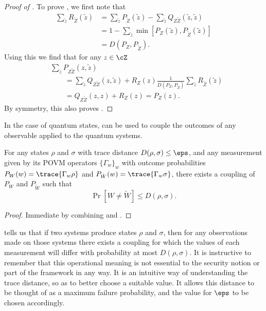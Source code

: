 \begin{proof}[Proof of ]
  To prove , we first note that
  \begin{align*}
    \sum_{\tilde{z}} R_{\tilde{Z}}(\tilde{z}) & = \sum_{\tilde{z}}
    P_{\tilde{Z}}(\tilde{z}) - \sum_{\tilde{z}}  Q_{Z
      \tilde{Z}}(\tilde{z},\tilde{z})  \\ & =
    1 - \sum_{\tilde{z}} \min[P_Z(\tilde{z}),
    P_{\tilde{Z}}(\tilde{z})] \\ & = D(P_Z,  P_{\tilde{Z}}) .
  \end{align*}
  Using this we find that for any $z \in \cZ$
  \begin{align*}
    & \sum_{\tilde{z}} P_{Z \tilde{Z}}(z,\tilde{z}) \\
  & \qquad = \sum_{\tilde{z}} Q_{Z \tilde{Z}}(z,\tilde{z}) + R_Z(z)
    \frac{1}{D(P_Z, P_{\tilde{Z}})} \sum_{\tilde{z}}  R_{\tilde{Z}}(\tilde{z})  \\
  & \qquad = Q_{Z \tilde{Z}}(z,z) +R_Z(z) = P_Z(z) .
  \end{align*}  
  By symmetry, this also proves .
\end{proof}

In the case of quantum states,  can be used to
couple the outcomes of any observable applied to the quantum systems.

\begin{cor}
\label{cor:difference}
For any states $\rho$ and $\sigma$ with trace distance $D(\rho,\sigma)
\leq \eps$, and any measurement given by its POVM operators
$\{\Gamma_w\}_w$ with outcome probabilities $P_W(w) = \trace{\Gamma_w
  \rho}$ and $P_{\tilde{W}}(w) = \trace{\Gamma_w \sigma}$, there
exists a coupling of $P_W$ and $P_{\tilde{W}}$ such that \[ \Pr[W \neq
\tilde{W}] \leq D(\rho,\sigma) .\]
\end{cor}

\begin{proof}
  Immediate by combining  and
  .
\end{proof}

 tells us that if two systems produce states
$\rho$ and $\sigma$, then for any observations made on those systems
there exists a coupling for which the values of each measurement will
differ with probability at most $D(\rho,\sigma)$. It is instructive to
remember that this operational meaning is not essential to the
security notion or part of the framework in any way. It is an
intuitive way of understanding the trace distance, so as to better
choose a suitable value. It allows this distance to be thought of as a
maximum failure probability, and the value for $\eps$ to be chosen
accordingly.

